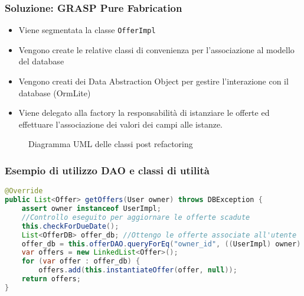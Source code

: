 \begin{frame}
    \frametitle{Soluzione: GRASP Pure Fabrication}
    \begin{minipage}{.48\textwidth}
        \begin{itemize}
            \item<1-> Viene segmentata la classe \texttt{OfferImpl}
            \item <2-> Vengono create le relative classi di convenienza per l'associazione al modello del database
            \item <3-> Vengono creati dei Data Abstraction Object per gestire l'interazione con il database (OrmLite)
            \item<4-> Viene delegato alla factory la responsabilità di istanziare le offerte ed effettuare l'associazione dei valori dei campi alle istanze.
        \end{itemize}
    \end{minipage}
    \begin{minipage}{.47\textwidth}
        \begin{figure}
            \centering
            \caption{Diagramma UML delle classi post refactoring}
        \end{figure}
    \end{minipage}
\end{frame}

\begin{frame}[fragile]
    \frametitle{Esempio di utilizzo DAO e classi di utilità}
    \lstset{style=java}
    \begin{lstlisting}[language=java, caption={OfferFactoryImpl\#getOffers()}]
@Override
public List<Offer> getOffers(User owner) throws DBException {
    assert owner instanceof UserImpl;
    //Controllo eseguito per aggiornare le offerte scadute
    this.checkForDueDate();
    List<OfferDB> offer_db; //Ottengo le offerte associate all'utente
    offer_db = this.offerDAO.queryForEq("owner_id", ((UserImpl) owner).getDbData());
    var offers = new LinkedList<Offer>();
    for (var offer : offer_db) {
        offers.add(this.instantiateOffer(offer, null));
    return offers;
}
    \end{lstlisting}
\end{frame}